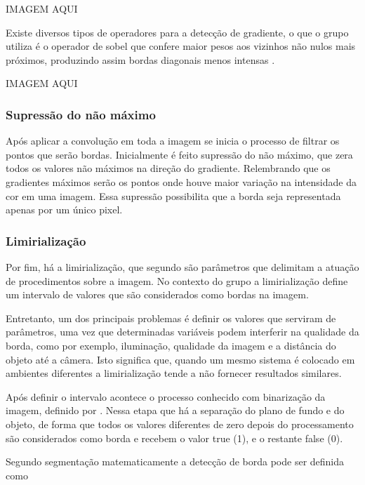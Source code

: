 \documentclass[12pt]{article}
\begin{document}
	IMAGEM AQUI
	
	Existe diversos tipos de operadores para a detecção de gradiente, o que o grupo utiliza é o operador de sobel que confere maior pesos aos vizinhos não nulos mais próximos, produzindo assim bordas diagonais menos intensas \cite{de2006introduccao}.
	
	IMAGEM AQUI
	
	\subsubsection{Supressão do não máximo}
	
	Após aplicar a convolução em toda a imagem se inicia o processo de filtrar os pontos que serão bordas. Inicialmente é feito supressão do não máximo, que zera todos os valores não máximos na direção do gradiente. Relembrando que os gradientes máximos serão os pontos onde houve maior variação na intensidade da cor em uma imagem. Essa supressão possibilita que a borda seja representada apenas por um único pixel.
	
	\subsubsection{Limirialização}
	
	Por fim, há a limirialização, que segundo \cite{silva2000segmentaccao} são parâmetros que delimitam a atuação de procedimentos sobre a imagem. No contexto do grupo a limirialização define um intervalo de valores que são considerados como bordas na imagem. 
	
	Entretanto, um dos principais problemas é definir os valores que serviram de parâmetros, uma vez que determinadas variáveis podem interferir na qualidade da borda, como por exemplo, iluminação, qualidade da imagem e a distância do objeto até a câmera. Isto significa que, quando um mesmo sistema é colocado em ambientes diferentes a limirialização tende a não fornecer resultados similares. 
	
	Após definir o intervalo acontece o processo conhecido com binarização da imagem, definido por \cite{silva2000segmentaccao}. Nessa etapa que há a separação do plano de fundo e do objeto, de forma que todos os valores diferentes de zero depois do processamento são considerados como borda e recebem o valor true (1), e o restante false (0).
	
	Segundo segmentação \cite{morgan2008tecnicas} matematicamente a detecção de borda pode ser definida como 
	
\end{document}
